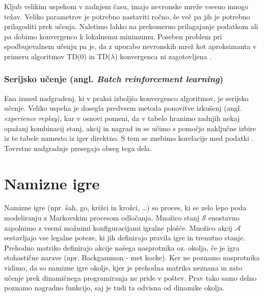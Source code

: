 \documentclass[12pt,a4paper]{amsart}
\theoremstyle{definition} %
\theoremstyle{plain} %
\begin{document}
Kljub velikim uspehom v zadnjem času, imajo nevronske mreže vseeno mnogo težav. Veliko parametrov je 
potrebno nastaviti ročno, še več pa jih je potrebno prilagoditi prek učenja. Naletimo lahko na 
prekomerno prilagajanje podatkom ali pa dobimo konvergenco k lokalnemu minimumu.
Poseben problem pri spodbujevalnem učenju pa je, da z uporabo nevronskih mrež kot aproksimanta 
v primeru algoritmov TD($0$) in TD($\lambda$) konvergenca ni zagotovljena \cite{RLintro}.

\subsubsection{Serijsko učenje (angl. \textit{Batch reinforcement learning})}
Ena izmed nadgradenj, ki v praksi izboljša konvergenco algoritmov, je serijsko učenje. Veliko uspeha 
je dosegla predvsem metoda ponovitve izkušenj (angl. \textit{experience replay}), kar v osnovi pomeni, 
da v tabelo hranimo zadnjih nekaj opažanj kombinacij stanj, akcij in nagrad in se učimo s pomočjo 
naključne izbire iz te tabele namesto iz iger direktno. S tem se znebimo korelacije med podatki 
\cite{LecNotesSilver}. Tovrstne nadgradnje presegajo obseg tega dela.

\section{Namizne igre}\label{nm}
Namizne igre (npr. šah, go, križci in krožci, \dots) so proces, ki se zelo lepo poda modeliranju z 
Markovskim procesom odločanja. Množico stanj $\mathcal{S}$ enostavno zapolnimo z vsemi možnimi 
konfiguracijami igralne plošče. Množico akcij $\mathcal{A}$ sestavljajo vse legalne poteze, ki jih 
definirajo pravila igre in trenutno stanje. Prehodno matriko definirajo akcije našega nasprotnika oz. 
okolja, če je igra stohastične narave (npr. Backgammon - met kocke). Ker ne poznamo nasprotnika vidimo, 
da so namizne igre okolje, kjer je prehodna matrika neznana in zato učenje prek dinamičnega programiranja 
ne pride v poštev. Prav tako samo delno poznamo nagradno funkcijo, saj je tudi ta odvisna od dinamike 
okolja.  
\end{document}
